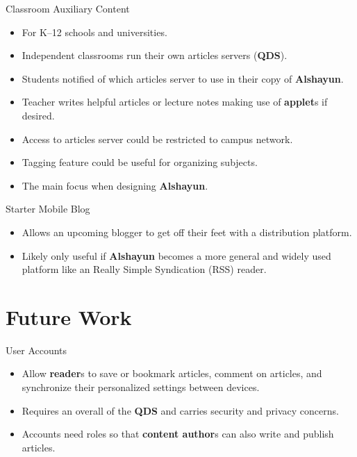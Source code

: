\documentclass{beamer}
\begin{document}
\begin{frame}{Classroom Auxiliary Content}
    \begin{itemize}
        \item For K--12 schools and universities.
        \item Independent classrooms run their own articles servers
            (\textbf{QDS}).
        \item Students notified of which articles server to use in their copy of
            \textbf{Alshayun}.
        \item Teacher writes helpful articles or lecture notes making use of
            \textbf{applet}s if desired.
        \item Access to articles server could be restricted to campus network.
        \item Tagging feature could be useful for organizing subjects.
        \item The main focus when designing \textbf{Alshayun}.
    \end{itemize}
\end{frame}

\begin{frame}{Starter Mobile Blog}
    \begin{itemize}
        \item Allows an upcoming blogger to get off their feet with a
            distribution platform.
        \item Likely only useful if \textbf{Alshayun} becomes a more general and
            widely used platform like an Really Simple Syndication (RSS) reader.
    \end{itemize}
\end{frame}

\section{Future Work}

\begin{frame}{User Accounts}
    \begin{itemize}
        \item Allow \textbf{reader}s to save or bookmark articles, comment on
            articles, and synchronize their personalized settings between
            devices.
        \item Requires an overall of the \textbf{QDS} and carries security and
            privacy concerns.
        \item Accounts need roles so that \textbf{content author}s can also
            write and publish articles.
    \end{itemize}
\end{frame}
\end{document}
